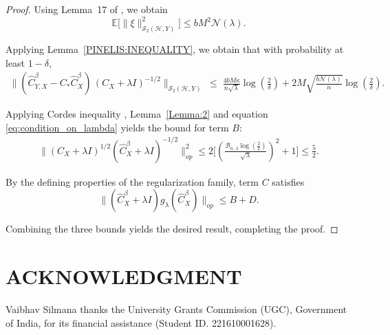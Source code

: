 \documentclass[twoside,11pt]{article}
\begin{document}
\begin{proof}
\noindent
Using Lemma~17 of \cite{meunier2024optimal}, we obtain
\[
\mathbb{E}\bigl[\|\xi\|_{\mathcal S_2(\mathcal H,Y)}^2\bigr]
\leq
bM^2
\mathcal{N}(\lambda).
\]

\noindent
Applying Lemma~\ref{PINELIS:INEQUALITY}, we obtain that with probability at least $1-\delta$,
\begin{align*}
\bigl\|
( \widehat{C}_{Y,X}^\beta-{C_*}\widehat C_X^\beta)\,
(C_X+\lambda I)^{-1/2}
\bigr\|_{\mathcal  S_2(\mathcal H,Y)}
\;\leq\;
\frac{4bM\kappa}{n\sqrt{\lambda}}
\log\!\left( \frac{2}{\delta} \right)
+ 2M
\sqrt{
\frac{b\mathcal{N}(\lambda)}{n}
}\log\!\left( \frac{2}{\delta} \right).
\end{align*}

\noindent
Applying Cordes inequality \cite{Cordes_1987}, Lemma~\ref{Lemma:2} and equation \eqref{eq:condition_on_lambda} yields the bound for term $B$:
\begin{align*}
\bigl\|
(C_{X}+\lambda I)^{1/2}
(\widehat{C}^{\beta}_{X}+\lambda I)^{-1/2}
\bigr\|_{op}^2
\leq
2\Biggl[
\left(
\frac{\mathcal{B}_{n,\lambda}
\log\!\left(\frac{2}{\delta}\right)}{\sqrt{\lambda}}
\right)^2
+1
\Biggr] \leq \frac{5}{2}.
\end{align*}

\noindent
By the defining properties of the regularization family, term $C$ satisfies
\[
\bigl\|
(\widehat{C}^{\beta}_{X}+\lambda I)
g_\lambda(\widehat{C}_X^\beta)
\bigr\|_{op}
\leq
B+D.
\]

Combining the three bounds yields the desired result, completing the proof.
\end{proof}






\section{ACKNOWLEDGMENT}

Vaibhav Silmana thanks the University Grants Commission (UGC), Government of India, for its ﬁnancial assistance (Student ID. 221610001628). 







\vskip 0.2in

\end{document}
